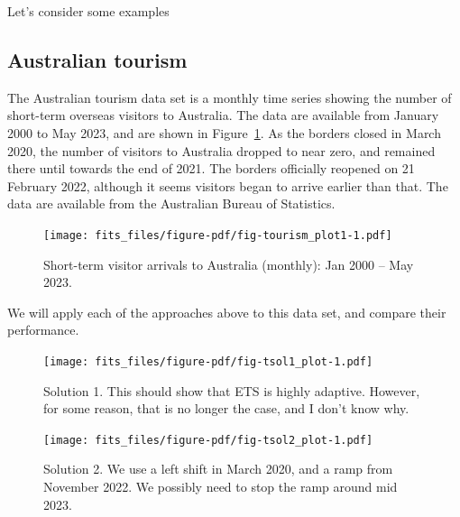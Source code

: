 \documentclass[11pt,a4paper,]{article}
\begin{document}
Let's consider some examples

\hypertarget{australian-tourism}{%
\subsection{Australian tourism}\label{australian-tourism}}

The Australian tourism data set is a monthly time series showing the
number of short-term overseas visitors to Australia. The data
\autocite{tourismdata} are available from January 2000 to May 2023, and
are shown in Figure~\ref{fig-tourism_plot1}. As the borders closed in
March 2020, the number of visitors to Australia dropped to near zero,
and remained there until towards the end of 2021. The borders officially
reopened on 21 February 2022, although it seems visitors began to arrive
earlier than that. The data are available from the Australian Bureau of
Statistics.

\begin{figure}

{\centering \texttt{[image: fits\_files/figure-pdf/fig-tourism\_plot1-1.pdf]}

}

\caption{\label{fig-tourism_plot1}Short-term visitor arrivals to
Australia (monthly): Jan 2000 -- May 2023.}

\end{figure}

We will apply each of the approaches above to this data set, and compare
their performance.

\begin{figure}

{\centering \texttt{[image: fits\_files/figure-pdf/fig-tsol1\_plot-1.pdf]}

}

\caption{\label{fig-tsol1_plot}Solution 1. This should show that ETS is
highly adaptive. However, for some reason, that is no longer the case,
and I don't know why.}

\end{figure}

\begin{figure}

{\centering \texttt{[image: fits\_files/figure-pdf/fig-tsol2\_plot-1.pdf]}

}

\caption{\label{fig-tsol2_plot}Solution 2. We use a left shift in March
2020, and a ramp from November 2022. We possibly need to stop the ramp
around mid 2023.}

\end{figure}
\end{document}
